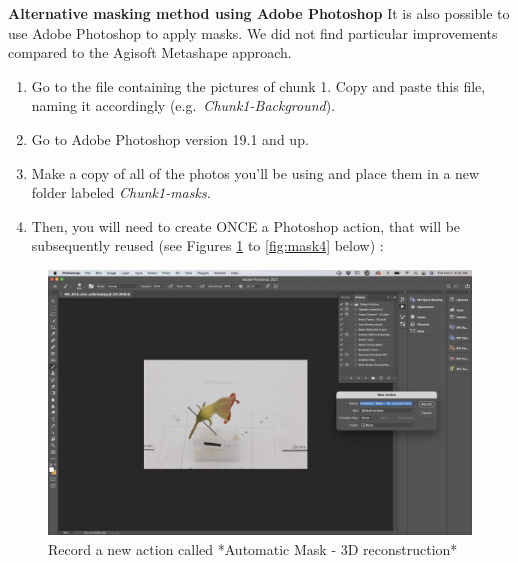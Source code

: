 \documentclass[
]{book}
\begin{document}
\textbf{Alternative masking method using Adobe Photoshop} It is also possible
to use Adobe Photoshop to apply masks. We did not find particular
improvements compared to the Agisoft Metashape approach.

\begin{enumerate}
\def\labelenumi{\arabic{enumi}.}
\item
  Go to the file containing the pictures of chunk 1. Copy and paste
  this file, naming it accordingly (e.g.~\emph{Chunk1-Background}).
\item
  Go to Adobe Photoshop version 19.1 and up.
\item
  Make a copy of all of the photos you'll be using and place them in a
  new folder labeled \emph{Chunk1-masks}.
\item
  Then, you will need to create ONCE a Photoshop action, that will be
  subsequently reused (see Figures \ref{fig:mask1} to \ref{fig:mask4} below) :
\end{enumerate}

\begin{figure}

{\centering \includegraphics[width=1\linewidth]{Figures/mask_1} 

}

\caption{Record a new action called *Automatic Mask - 3D reconstruction*}\label{fig:mask1}
\end{figure}
\end{document}
